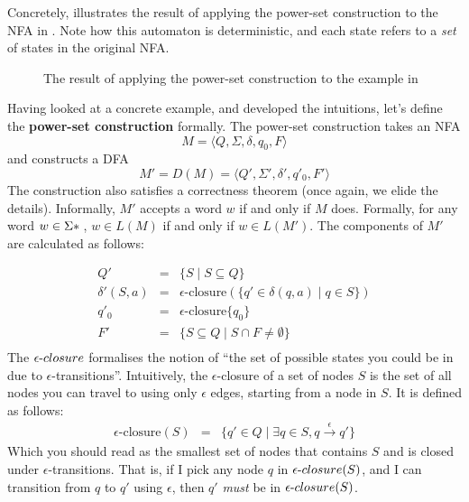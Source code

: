 Concretely,  illustrates the result of applying the power-set construction to the NFA in . Note how this automaton is deterministic, and each state refers to a \textit{set} of states in the original NFA.

\begin{figure}[H]
    \centering
    \caption{The result of applying the power-set construction to the example in }
    \label{fig:powerset-construction}
\end{figure}

Having looked at a concrete example, and developed the intuitions, let's define the \textbf{power-set construction} formally. The power-set construction takes an NFA
\[
M = \langle Q,\Sigma,\delta,q_0,F\rangle
\]
and constructs a DFA
\[
M' = D(M) = \langle Q',\Sigma',\delta',q'_0,F'\rangle
\]
The construction also satisfies a correctness theorem (once again, we elide the details). Informally, $M'$ accepts a word $w$ if and only if $M$ does. Formally, for any word $w \in \Sigma\*$, $w \in L(M)$ if and only if $w \in L(M')$. The components of $M'$ are calculated as follows:

\[
\begin{array}{rcl}
Q' &=& \{S \mid S \subseteq Q\}\\[1ex]
\delta'(S,a) &=& \epsilon\text{-closure}(\{q'\in\delta(q,a)\mid q \in S\})\\[1ex]
q'_0 &=& \epsilon\text{-closure}\{q_0\}\\[1ex]
F' &=& \{S \subseteq Q \mid S \cap F \neq \emptyset\}\\[1ex]
\end{array}
\]
The $\epsilon{\text-closure}$ formalises the notion of ``the set of possible states you could be in due to $\epsilon$-transitions''. Intuitively, the $\epsilon$-closure of a set of nodes $S$ is the set of all nodes you can travel to using only $\epsilon$ edges, starting from a node in $S$. It is defined as follows:
\[
\begin{array}{rcl}
\epsilon\text{-closure}(S) &=& \{q' \in Q \mid \exists q \in S, q \xrightarrow{\epsilon}q'\}
\end{array}
\]
Which you should read as the smallest set of nodes that contains $S$ and is closed under $\epsilon$-transitions. That is, if I pick any node $q$ in $\epsilon{\text-closure}(S)$, and I can transition from $q$ to $q'$ using $\epsilon$, then $q'$ \textit{must} be in $\epsilon{\text-closure}(S)$.

